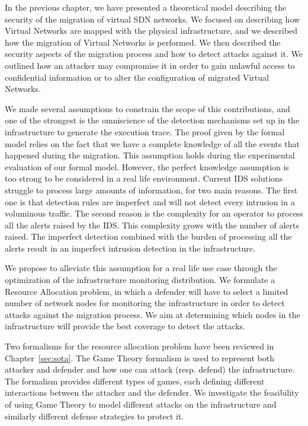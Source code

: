 In the previous chapter, we have presented a theoretical model describing the security of the migration of virtual SDN networks. We focused on describing how Virtual Networks are mapped with the physical infrastructure, and we described how the migration of Virtual Networks is performed. We then described the security aspects of the migration process and how to detect attacks against it. We outlined how an attacker may compromise it in order to gain unlawful access to confidential information or to alter the configuration of migrated Virtual Networks.

We made several assumptions to constrain the scope of this contributions, and one of the strongest is the omniscience of the detection mechanisms set up in the infrastructure to generate the execution trace. The proof given by the formal model relies on the fact that we have a complete knowledge of all the events that happened during the migration. This assumption holds during the experimental evaluation of our formal model. 
However, the perfect knowledge assumption is too strong to be considered in a real life environment. 
Current IDS solutions struggle to process large amounts of information, for two main reasons. The first one is that detection rules are imperfect and will not detect every intrusion in a voluminous traffic. The second reason is the complexity for an operator to process all the alerts raised by the IDS. This complexity grows with the number of alerts raised. The imperfect detection combined with the burden of processing all the alerts result in an imperfect intrusion detection in the infrastructure.

We propose to alleviate this assumption for a real life use case through the optimization of the infrastructure monitoring distribution. We formulate a Resource Allocation problem, in which a defender will have to select a limited number of network nodes for monitoring the infrastructure in order to detect attacks against the migration process. We aim at determining which nodes in the infrastructure will provide the best coverage to detect the attacks. 

Two formalisms for the resource allocation problem have been reviewed in Chapter~\ref{sec:sota}.
The Game Theory formalism is used to represent both attacker and defender and how one can attack (resp. defend) the infrastructure.
The formalism provides different types of games, each defining different interactions between the attacker and the defender.
We investigate the feasibility of using Game Theory to model different attacks on the infrastructure and similarly different defense strategies to protect it.

